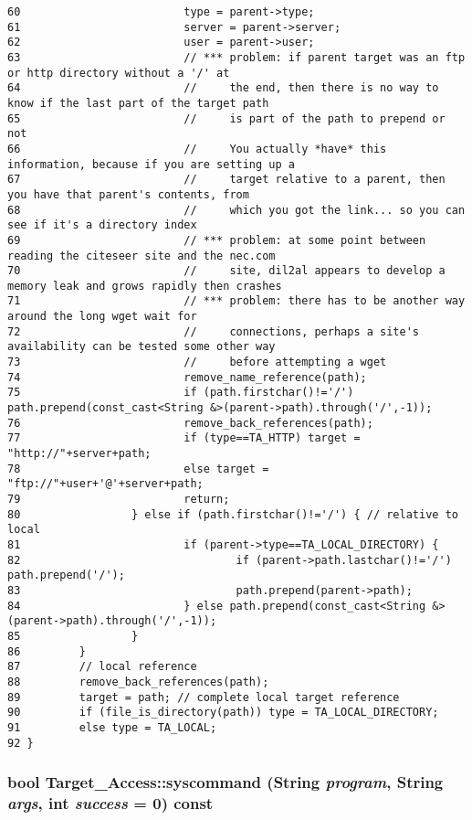 \begin{verbatim}
60                         type = parent->type;
61                         server = parent->server;
62                         user = parent->user;
63                         // *** problem: if parent target was an ftp or http directory without a '/' at
64                         //     the end, then there is no way to know if the last part of the target path
65                         //     is part of the path to prepend or not
66                         //     You actually *have* this information, because if you are setting up a
67                         //     target relative to a parent, then you have that parent's contents, from
68                         //     which you got the link... so you can see if it's a directory index
69                         // *** problem: at some point between reading the citeseer site and the nec.com
70                         //     site, dil2al appears to develop a memory leak and grows rapidly then crashes
71                         // *** problem: there has to be another way around the long wget wait for
72                         //     connections, perhaps a site's availability can be tested some other way
73                         //     before attempting a wget
74                         remove_name_reference(path);
75                         if (path.firstchar()!='/') path.prepend(const_cast<String &>(parent->path).through('/',-1));
76                         remove_back_references(path);
77                         if (type==TA_HTTP) target = "http://"+server+path;
78                         else target = "ftp://"+user+'@'+server+path;
79                         return;
80                 } else if (path.firstchar()!='/') { // relative to local
81                         if (parent->type==TA_LOCAL_DIRECTORY) {
82                                 if (parent->path.lastchar()!='/') path.prepend('/');
83                                 path.prepend(parent->path);
84                         } else path.prepend(const_cast<String &>(parent->path).through('/',-1));
85                 }
86         }
87         // local reference
88         remove_back_references(path);
89         target = path; // complete local target reference
90         if (file_is_directory(path)) type = TA_LOCAL_DIRECTORY;
91         else type = TA_LOCAL;
92 }
\end{verbatim}\normalsize 
{}
\subsubsection{\setlength{\rightskip}{0pt plus 5cm}bool Target\_\-Access::syscommand ({\bf String} {\em program}, {\bf String} {\em args}, int {\em success} = 0) const\hspace{0.3cm}{\tt  [protected]}}\label{classTarget__Access_b8}




